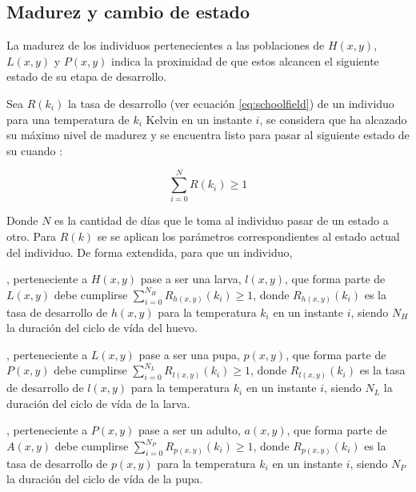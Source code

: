 \subsection{Madurez y cambio de estado}
La madurez de los individuos pertenecientes a las poblaciones de $H(x,y)$, $L(x,y)$ y $P(x,y)$
indica la proximidad de que estos alcancen el siguiente estado de su etapa de desarrollo.

Sea $R(k_{i})$ la tasa de desarrollo (ver ecuación \eqref{eq:schoolfield}) de un individuo para
una temperatura de $k_{i}$ Kelvin en un instante $i$, se considera que ha alcazado su máximo nivel
de madurez y se encuentra listo para pasar al siguiente estado de su cuando :

\begin{equation}
\label{eq:condicion-cambio-estado}
    \sum_{i=0}^{N} R(k_{i}) \geq 1
\end{equation}

Donde $N$ es la cantidad de días que le toma al individuo pasar de un estado a otro. Para $R(k)$ se
se aplican los parámetros correspondientes al estado actual del individuo. De forma extendida,
para que un individuo,

\begin{description}[style=multiline,leftmargin=1.5cm]
\item[$h(x,y)$], perteneciente a $H(x,y)$ pase a ser una larva, $l(x,y)$, que forma
parte de $L(x,y)$ debe cumplirse $\sum_{i=0}^{N_{H}} R_{h(x,y)}(k_{i}) \geq 1$, donde
$R_{h(x,y)}(k_{i})$ es la tasa de desarrollo de $h(x,y)$ para la temperatura $k_{i}$ en un
instante $i$, siendo $N_{H}$ la duración del ciclo de vída del huevo.

\item[$l(x,y)$], perteneciente a $L(x,y)$ pase a ser una pupa, $p(x,y)$, que forma
parte de $P(x,y)$ debe cumplirse $\sum_{i=0}^{N_{L}} R_{l(x,y)}(k_{i}) \geq 1$, donde
$R_{l(x,y)}(k_{i})$ es la tasa de desarrollo de $l(x,y)$ para la temperatura $k_{i}$ en un
instante $i$, siendo $N_{L}$ la duración del ciclo de vída de la larva.

\item[$p(x,y)$], perteneciente a $P(x,y)$ pase a ser un adulto, $a(x,y)$, que forma
parte de $A(x,y)$ debe cumplirse $\sum_{i=0}^{N_{P}} R_{p(x,y)}(k_{i}) \geq 1$, donde
$R_{p(x,y)}(k_{i})$ es la tasa de desarrollo de $p(x,y)$ para la temperatura $k_{i}$ en un
instante $i$, siendo $N_{P}$ la duración del ciclo de vída de la pupa.
\end{description}




